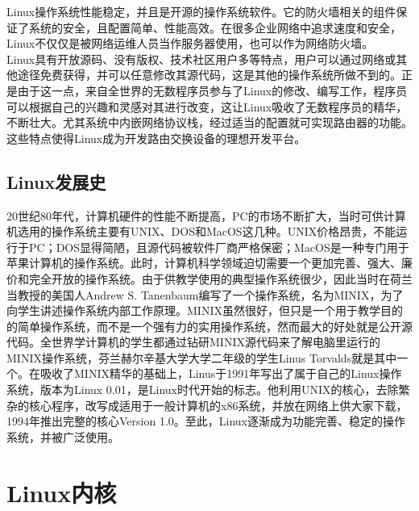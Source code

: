 \documentclass[12pt, openany, oneside]{book}
\begin{document}
Linux操作系统性能稳定，并且是开源的操作系统软件。它的防火墙相关的组件保证了系统的安全，且配置简单、性能高效。在很多企业网络中追求速度和安全，Linux不仅仅是被网络运维人员当作服务器使用，也可以作为网络防火墙。 \\

Linux具有开放源码、没有版权、技术社区用户多等特点，用户可以通过网络或其他途径免费获得，并可以任意修改其源代码，这是其他的操作系统所做不到的。正是由于这一点，来自全世界的无数程序员参与了Linux的修改、编写工作，程序员可以根据自己的兴趣和灵感对其进行改变，这让Linux吸收了无数程序员的精华，不断壮大。尤其系统中内嵌网络协议栈，经过适当的配置就可实现路由器的功能。这些特点使得Linux成为开发路由交换设备的理想开发平台。 \\

\subsection{Linux发展史}

20世纪80年代，计算机硬件的性能不断提高，PC的市场不断扩大，当时可供计算机选用的操作系统主要有UNIX、DOS和MacOS这几种。UNIX价格昂贵，不能运行于PC；DOS显得简陋，且源代码被软件厂商严格保密；MacOS是一种专门用于苹果计算机的操作系统。此时，计算机科学领域迫切需要一个更加完善、强大、廉价和完全开放的操作系统。由于供教学使用的典型操作系统很少，因此当时在荷兰当教授的美国人Andrew S. Tanenbaum编写了一个操作系统，名为MINIX，为了向学生讲述操作系统内部工作原理。MINIX虽然很好，但只是一个用于教学目的的简单操作系统，而不是一个强有力的实用操作系统，然而最大的好处就是公开源代码。全世界学计算机的学生都通过钻研MINIX源代码来了解电脑里运行的MINIX操作系统，芬兰赫尔辛基大学大学二年级的学生Linus Torvalds就是其中一个。在吸收了MINIX精华的基础上，Linus于1991年写出了属于自己的Linux操作系统，版本为Linux 0.01，是Linux时代开始的标志。他利用UNIX的核心，去除繁杂的核心程序，改写成适用于一般计算机的x86系统，并放在网络上供大家下载，1994年推出完整的核心Version 1.0。至此，Linux逐渐成为功能完善、稳定的操作系统，并被广泛使用。 \\

\newpage

\section{Linux内核}
\end{document}
